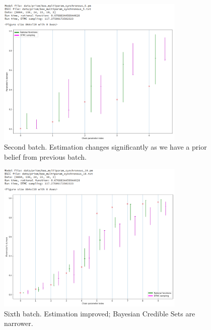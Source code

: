 \documentclass[12pt]{article}
\theoremstyle{definition}
\begin{document}
\begin{figure}[H]
  \centering
  \includegraphics[width=0.8\textwidth,keepaspectratio]{figures/normal_5.png}
  \caption{Second batch. Estimation changes significantly as we have a prior
    belief from previous batch.}
\end{figure}

\begin{figure}[H]
  \centering
  \includegraphics[width=0.8\textwidth,keepaspectratio]{figures/normal_10.png}
  \caption{Sixth batch. Estimation improved; Bayesian Credible Sets are narrower.}
\end{figure}
\end{document}
